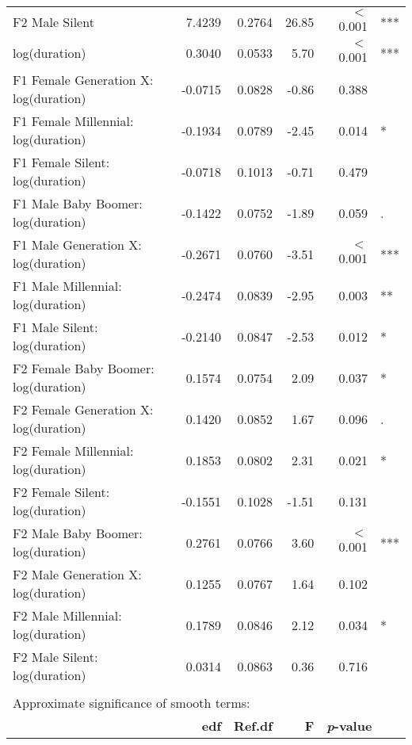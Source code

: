 \begin{table}[ht]
{{\begin{tabular}{l r r r r@{\hskip1pt} @{\hskip0pt}l}
{}F2 Male Silent                &  7.4239 &    0.2764 &   26.85 &     $<$ 0.001 & *** \\
log(duration)                                         &  0.3040 &    0.0533 &    5.70 &     $<$ 0.001 & *** \\
{}F1 Female Generation X: log(duration)         & -0.0715 &    0.0828 &   -0.86 &         0.388 &     \\
{}F1 Female Millennial: log(duration)   & -0.1934 &    0.0789 &   -2.45 &         0.014 & *   \\
{}F1 Female Silent: log(duration)       & -0.0718 &    0.1013 &   -0.71 &         0.479 &     \\
{}F1 Male Baby Boomer: log(duration)       & -0.1422 &    0.0752 &   -1.89 &         0.059 & .   \\
{}F1 Male Generation X: log(duration)         & -0.2671 &    0.0760 &   -3.51 &     $<$ 0.001 & *** \\
{}F1 Male Millennial: log(duration)   & -0.2474 &    0.0839 &   -2.95 &         0.003 & **  \\
{}F1 Male Silent: log(duration)       & -0.2140 &    0.0847 &   -2.53 &         0.012 & *   \\
{}F2 Female Baby Boomer: log(duration)       &  0.1574 &    0.0754 &    2.09 &         0.037 & *   \\
{}F2 Female Generation X: log(duration)         &  0.1420 &    0.0852 &    1.67 &         0.096 & .   \\
{}F2 Female Millennial: log(duration)   &  0.1853 &    0.0802 &    2.31 &         0.021 & *   \\
{}F2 Female Silent: log(duration)       & -0.1551 &    0.1028 &   -1.51 &         0.131 &     \\
{}F2 Male Baby Boomer: log(duration)       &  0.2761 &    0.0766 &    3.60 &     $<$ 0.001 & *** \\
{}F2 Male Generation X: log(duration)         &  0.1255 &    0.0767 &    1.64 &         0.102 &     \\
{}F2 Male Millennial: log(duration)   &  0.1789 &    0.0846 &    2.12 &         0.034 & *   \\
{}F2 Male Silent: log(duration)       &  0.0314 &    0.0863 &    0.36 &         0.716 &     \\
\\
\multicolumn{6}{l}{Approximate significance of smooth terms:}\\
 & \textbf{edf} & \textbf{Ref.df} & \textbf{F} & \multicolumn{2}{l}{\textbf{\textit{p}-value}}\\

\end{tabular}}}
\end{table}
